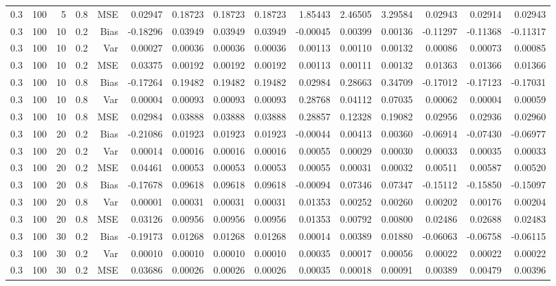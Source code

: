 \begin{table}[!htbp]
\begin{tabular}{lrrrrrrrrrrrrrr}
0.3 & 100 &  5 & 0.8 & MSE & 0.02947 & 0.18723 & 0.18723 & 0.18723 & 1.85443 & 2.46505 & 3.29584 & 0.02943 & 0.02914 & 0.02943 \\
0.3 & 100 & 10 & 0.2 & Bias & -0.18296 & 0.03949 & 0.03949 & 0.03949 & -0.00045 & 0.00399 & 0.00136 & -0.11297 & -0.11368 & -0.11317 \\
0.3 & 100 & 10 & 0.2 & Var & 0.00027 & 0.00036 & 0.00036 & 0.00036 & 0.00113 & 0.00110 & 0.00132 & 0.00086 & 0.00073 & 0.00085 \\
0.3 & 100 & 10 & 0.2 & MSE & 0.03375 & 0.00192 & 0.00192 & 0.00192 & 0.00113 & 0.00111 & 0.00132 & 0.01363 & 0.01366 & 0.01366 \\
0.3 & 100 & 10 & 0.8 & Bias & -0.17264 & 0.19482 & 0.19482 & 0.19482 & 0.02984 & 0.28663 & 0.34709 & -0.17012 & -0.17123 & -0.17031 \\
0.3 & 100 & 10 & 0.8 & Var & 0.00004 & 0.00093 & 0.00093 & 0.00093 & 0.28768 & 0.04112 & 0.07035 & 0.00062 & 0.00004 & 0.00059 \\
0.3 & 100 & 10 & 0.8 & MSE & 0.02984 & 0.03888 & 0.03888 & 0.03888 & 0.28857 & 0.12328 & 0.19082 & 0.02956 & 0.02936 & 0.02960 \\
0.3 & 100 & 20 & 0.2 & Bias & -0.21086 & 0.01923 & 0.01923 & 0.01923 & -0.00044 & 0.00413 & 0.00360 & -0.06914 & -0.07430 & -0.06977 \\
0.3 & 100 & 20 & 0.2 & Var & 0.00014 & 0.00016 & 0.00016 & 0.00016 & 0.00055 & 0.00029 & 0.00030 & 0.00033 & 0.00035 & 0.00033 \\
0.3 & 100 & 20 & 0.2 & MSE & 0.04461 & 0.00053 & 0.00053 & 0.00053 & 0.00055 & 0.00031 & 0.00032 & 0.00511 & 0.00587 & 0.00520 \\
0.3 & 100 & 20 & 0.8 & Bias & -0.17678 & 0.09618 & 0.09618 & 0.09618 & -0.00094 & 0.07346 & 0.07347 & -0.15112 & -0.15850 & -0.15097 \\
0.3 & 100 & 20 & 0.8 & Var & 0.00001 & 0.00031 & 0.00031 & 0.00031 & 0.01353 & 0.00252 & 0.00260 & 0.00202 & 0.00176 & 0.00204 \\
0.3 & 100 & 20 & 0.8 & MSE & 0.03126 & 0.00956 & 0.00956 & 0.00956 & 0.01353 & 0.00792 & 0.00800 & 0.02486 & 0.02688 & 0.02483 \\
0.3 & 100 & 30 & 0.2 & Bias & -0.19173 & 0.01268 & 0.01268 & 0.01268 & 0.00014 & 0.00389 & 0.01880 & -0.06063 & -0.06758 & -0.06115 \\
0.3 & 100 & 30 & 0.2 & Var & 0.00010 & 0.00010 & 0.00010 & 0.00010 & 0.00035 & 0.00017 & 0.00056 & 0.00022 & 0.00022 & 0.00022 \\
0.3 & 100 & 30 & 0.2 & MSE & 0.03686 & 0.00026 & 0.00026 & 0.00026 & 0.00035 & 0.00018 & 0.00091 & 0.00389 & 0.00479 & 0.00396 \\

\end{tabular}
\end{table}
